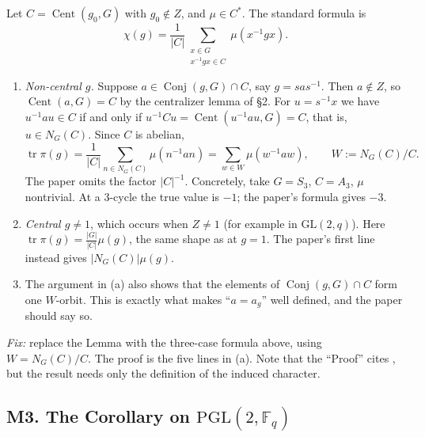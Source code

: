 \documentclass[12pt,letterpaper]{article}
\newcommand{\F}{\mathbb{F}}
\newcommand{\Cent}{\operatorname{Cent}}
\newcommand{\tr}{\operatorname{tr}}
\newcommand{\PGL}{\mathrm{PGL}}
\newcommand{\GL}{\mathrm{GL}}
\theoremstyle{definition}
\begin{document}
Let $C=\Cent(g_0,G)$ with $g_0\notin Z$, and $\mu\in C^*$. The standard
formula is
\[
\chi(g)=\frac{1}{|C|}\sum_{\substack{x\in G\\ x^{-1}gx\in C}}\mu(x^{-1}gx).
\]
\begin{enumerate}[label=(\alph*),itemsep=1pt]
\item \emph{Non-central $g$.} Suppose $a\in\operatorname{Conj}(g,G)\cap
  C$, say $g=sas^{-1}$. Then $a\notin Z$, so $\Cent(a,G)=C$ by
  the centralizer lemma of \S2. For $u=s^{-1}x$ we have $u^{-1}au\in C$ if
  and only if $u^{-1}Cu=\Cent(u^{-1}au,G)=C$, that is, $u\in N_G(C)$.
  Since $C$ is abelian,
  \[
  \tr\pi(g)=\frac1{|C|}\sum_{n\in N_G(C)}\mu(n^{-1}an)
  =\sum_{w\in W}\mu(w^{-1}aw),\qquad W:=N_G(C)/C.
  \]
  The paper omits the factor $|C|^{-1}$. Concretely, take $G=S_3$,
  $C=A_3$, $\mu$ nontrivial. At a $3$-cycle the true value is $-1$; the
  paper's formula gives $-3$.
\item \emph{Central $g\ne1$}, which occurs when $Z\ne1$ (for example in
  $\GL(2,q)$). Here $\tr\pi(g)=\tfrac{|G|}{|C|}\mu(g)$, the same shape
  as at $g=1$. The paper's first line instead gives $|N_G(C)|\mu(g)$.
\item The argument in (a) also shows that the elements of
  $\operatorname{Conj}(g,G)\cap C$ form one $W$-orbit. This is exactly
  what makes ``$a=a_g$'' well defined, and the paper should say so.
\end{enumerate}
\emph{Fix:} replace the Lemma with the three-case formula above, using
$W=N_G(C)/C$. The proof is the five lines in (a). Note that the
``Proof'' cites \cite[Ch.~7]{Se}, but the result needs only the
definition of the induced character.

\subsection*{M3. The Corollary on $\PGL(2,\F_q)$}
\end{document}
